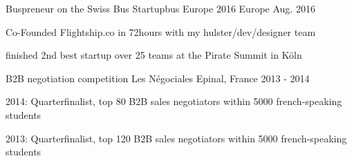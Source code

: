 

\begin{cventries}

  \cventry
    {Buspreneur on the Swiss Bus} %
    {Startupbus Europe 2016} %
    {Europe} %
    {Aug. 2016} %
    {
      \begin{cvitems} %
        \item {Co-Founded Flightship.co in 72hours with my hulster/dev/designer team}
        \item {finished 2nd best startup over 25 teams at the Pirate Summit in Köln}
      \end{cvitems}
    }

  \cventry
    {B2B negotiation competition} %
    {Les Négociales} %
    {Epinal, France} %
    {2013 - 2014} %
    {
    	\begin{cvitems}
    	\item{2014: Quarterfinalist, top 80 B2B sales negotiators within 5000 french-speaking students}
    	\item{2013: Quarterfinalist, top 120 B2B sales negotiators within 5000 french-speaking students}
    	\end{cvitems}
    }
\end{cventries}

